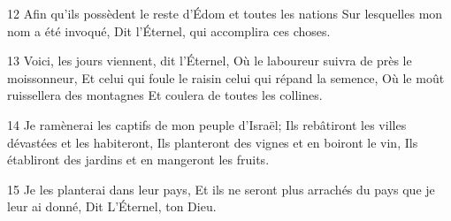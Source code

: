 \par 12 Afin qu'ils possèdent le reste d'Édom et toutes les nations Sur lesquelles mon nom a été invoqué, Dit l'Éternel, qui accomplira ces choses.
\par 13 Voici, les jours viennent, dit l'Éternel, Où le laboureur suivra de près le moissonneur, Et celui qui foule le raisin celui qui répand la semence, Où le moût ruissellera des montagnes Et coulera de toutes les collines.
\par 14 Je ramènerai les captifs de mon peuple d'Israël; Ils rebâtiront les villes dévastées et les habiteront, Ils planteront des vignes et en boiront le vin, Ils établiront des jardins et en mangeront les fruits.
\par 15 Je les planterai dans leur pays, Et ils ne seront plus arrachés du pays que je leur ai donné, Dit L'Éternel, ton Dieu.


